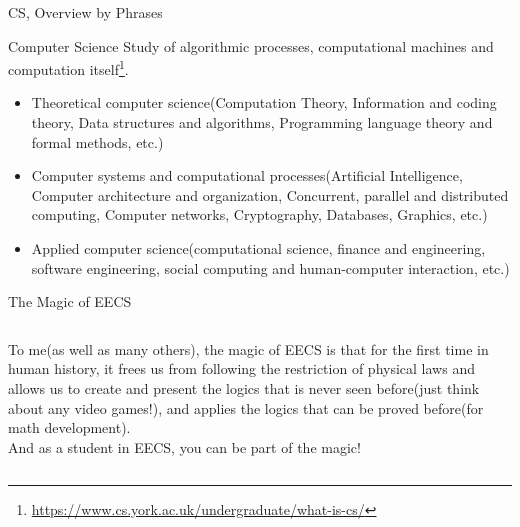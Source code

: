 \documentclass[aspectratio=169, 12pt]{beamer}
\begin{document}
\begin{frame}{CS, Overview by Phrases}
\begin{block}{Computer Science}
Study of algorithmic processes, computational machines and computation itself\footnote{\tiny\url{https://www.cs.york.ac.uk/undergraduate/what-is-cs/}}.
\end{block}
\begin{itemize}
\scriptsize
\item Theoretical computer science(Computation Theory, Information and coding theory, Data structures and algorithms, Programming language theory and formal methods, etc.)
\item Computer systems and computational processes(Artificial Intelligence, Computer architecture and organization, Concurrent, parallel and distributed computing, Computer networks, Cryptography, Databases, Graphics, etc.)
\item Applied computer science(computational science, finance and engineering, software engineering, social computing and human-computer interaction, etc.)
\end{itemize}
\end{frame}

\begin{frame}{The Magic of EECS}
    \begin{columns}
            \centering
            To me(as well as many others), the magic of EECS is that for the first time in human history, it frees us from following the restriction of physical laws and allows us to create and present the logics that is never seen before(just think about any video games!), and applies the logics that can be proved before(for math development).
            \\\medskip
            And as a student in EECS, you can be part of the magic!
    \end{columns}
\end{frame}
\end{document}

